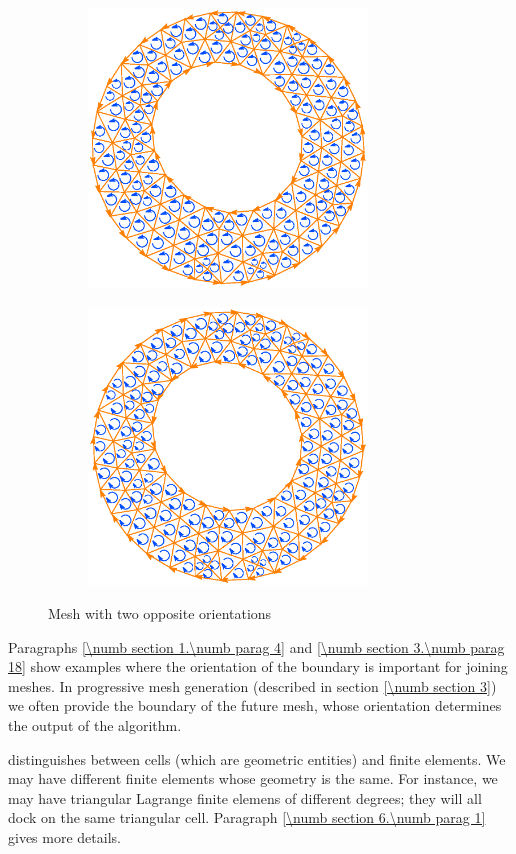 \begin{figure}[ht] \centering
\begin{subfigure}{75mm}\centering
  \includegraphics[width=74mm]{oriented-annulus-1}
\end{subfigure}  
\begin{subfigure}{75mm}\centering
  \includegraphics[width=74mm]{oriented-annulus-2}
\end{subfigure}  
  \caption{Mesh with two opposite orientations}
  \label{\numb section 1.\numb fig 4}
\end{figure}

Paragraphs \ref{\numb section 1.\numb parag 4} and \ref{\numb section 3.\numb parag 18}
show examples where the orientation of the boundary is important for joining meshes.
In progressive mesh generation (described in section \ref{\numb section 3}) we often
provide the boundary of the future mesh, whose orientation determines the output of the
algorithm.
\vfil\eject

{\ManiFEM} distinguishes between cells (which are geometric entities) and finite elements.
We may have different finite elements whose geometry is the same.
For instance, we may have triangular Lagrange finite elemens of different degrees;
they will all dock on the same triangular cell.
Paragraph \ref{\numb section 6.\numb parag 1} gives more details.

